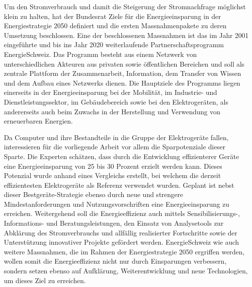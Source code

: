 Um den Stromverbrauch und damit die Steigerung der Stromnachfrage möglichst klein zu halten, hat der Bundesrat Ziele für die Energieeinsparung in der Energiestrategie 2050 definiert und die ersten Massnahmenpakete zu deren Umsetzung beschlossen. Eine der beschlossenen Massnahmen ist das im Jahr 2001 eingeführte und bis ins Jahr 2020 weiterlaufende Partnerschaftsprogramm EnergieSchweiz. Das Programm besteht aus einem Netzwerk von unterschiedlichen Akteuren aus privaten sowie öffentlichen Bereichen und soll als zentrale Plattform der Zusammenarbeit, Information, dem Transfer von Wissen und dem Aufbau eines Netzwerks dienen. Die Hauptziele des Programms liegen einerseits in der Energieeinsparung bei der Mobilität, im Industrie- und Dienstleistungssektor, im Gebäudebereich sowie bei den Elektrogeräten, als andererseits auch beim Zuwachs in der Herstellung und Verwendung von erneuerbaren Energien. 
\par
Da Computer und ihre Bestandteile in die Gruppe der Elektrogeräte fallen, interessieren für die vorliegende Arbeit vor allem die Sparpotenziale dieser Sparte. Die Experten schätzen, dass durch die Entwicklung effizienterer Geräte eine Energieeinsparung von 25 bis 30 Prozent erzielt werden kann. Dieses Potenzial wurde anhand eines Vergleichs erstellt, bei welchem die derzeit effizientesten Elektrogeräte als Referenz verwendet wurden. Geplant ist nebst dieser Bestgeräte-Strategie ebenso durch neue und strengere Mindestanforderungen und Nutzungsvorschriften eine Energieeinsparung zu erreichen. Weitergehend soll die Energieeffizienz auch mittels Sensibilisierungs-, Informations- und Beratungsleistungen, den Einsatz von Analysetools zur Abklärung des Stromverbrauchs und allfällig realisierter Fortschritte sowie der Unterstützung innovativer Projekte gefördert werden. EnergieSchweiz wie auch weitere Massnahmen, die im Rahmen der Energiestrategie 2050 ergriffen werden, wollen somit die Energieeffizienz nicht nur durch Einsparungen verbessern, sondern setzen ebenso auf Aufklärung, Weiterentwicklung und neue Technologien, um dieses Ziel zu erreichen.







